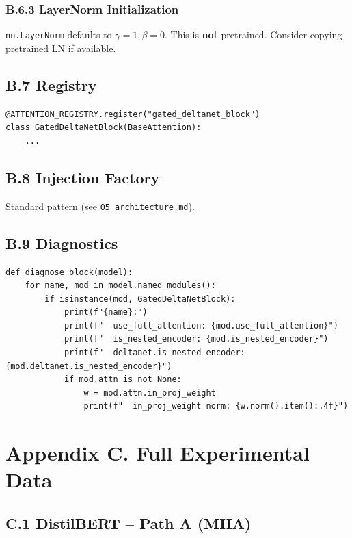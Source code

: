\subsubsection{B.6.3 LayerNorm Initialization}

\texttt{nn.LayerNorm} defaults to $\gamma = 1, \beta = 0$. This is \textbf{not} 
pretrained. Consider copying pretrained LN if available.

\subsection{B.7 Registry}

\begin{lstlisting}
@ATTENTION_REGISTRY.register("gated_deltanet_block")
class GatedDeltaNetBlock(BaseAttention):
    ...
\end{lstlisting}

\subsection{B.8 Injection Factory}

Standard pattern (see \texttt{05\_architecture.md}).

\subsection{B.9 Diagnostics}

\begin{lstlisting}
def diagnose_block(model):
    for name, mod in model.named_modules():
        if isinstance(mod, GatedDeltaNetBlock):
            print(f"{name}:")
            print(f"  use_full_attention: {mod.use_full_attention}")
            print(f"  is_nested_encoder: {mod.is_nested_encoder}")
            print(f"  deltanet.is_nested_encoder: {mod.deltanet.is_nested_encoder}")
            if mod.attn is not None:
                w = mod.attn.in_proj_weight
                print(f"  in_proj_weight norm: {w.norm().item():.4f}")
\end{lstlisting}




\section{Appendix C. Full Experimental Data}

\subsection{C.1 DistilBERT -- Path A (MHA)}

